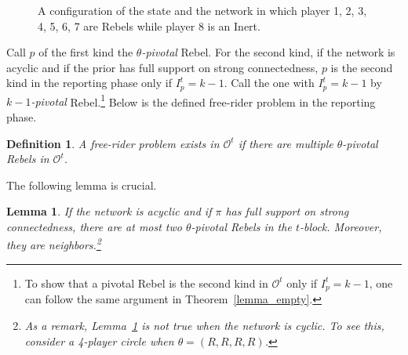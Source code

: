 \documentclass[12pt,letter]{article}
\newcommand{\Omicron}{\mathcal{O}}
\newtheorem{lemma}{Lemma}[section]
\newtheorem{definition}{Definition}[section]
\theoremstyle{definition}
\theoremstyle{remark}
\theoremstyle{claim}
\begin{document}
\begin{figure}


\begin{center}
\end{center}
\caption{A configuration of the state and the network in which player 1, 2, 3, 4, 5, 6, 7 are Rebels while player 8 is an Inert.}
\label{fig:k-1_pivotal}
\end{figure}

Call $p$ of the first kind the \textit{$\theta$-pivotal} Rebel. For the second kind, if the network is acyclic and if the prior has full support on strong connectedness, $p$ is the second kind in the reporting phase only if $I^{t}_p=k-1$. Call the one with $I^t_p=k-1$ by \textit{$k-1$-pivotal} Rebel.\footnote{To show that a pivotal Rebel is the second kind in $\Omicron^{t}$ only if $I^{t}_p=k-1$, one can follow the same argument in Theorem~\ref{lemma_empty}.} Below is the defined free-rider problem in the reporting phase.

\begin{definition}
A free-rider problem exists in $\Omicron^t$ if there are multiple $\theta$-pivotal Rebels in $\Omicron^t$.
\end{definition}



The following lemma is crucial. 
\begin{lemma}
\label{lemma_at_most_two_nodes}
If the network is acyclic and if $\pi$ has full support on strong connectedness, there are at most two $\theta$-pivotal Rebels in the $t$-block. Moreover, they are neighbors.\footnote{As a remark, Lemma~\ref{lemma_at_most_two_nodes} is not true when the network is cyclic. To see this, consider a 4-player circle when $\theta=(R,R,R,R)$.}
\end{lemma}
\end{document}

